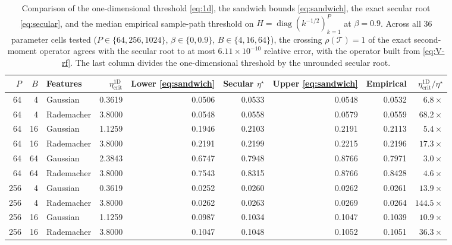 \documentclass[11pt]{article}
\theoremstyle{remark}
\begin{document}
\begin{table}[!ht]
\centering
\caption{Comparison of the one-dimensional threshold \eqref{eq:1d}, the sandwich bounds \eqref{eq:sandwich}, the exact secular root \eqref{eq:secular}, and the median empirical sample-path threshold on $H = \operatorname{diag}(k^{-1/2})_{k=1}^P$ at $\beta = 0.9$. Across all 36 parameter cells tested ($P \in \{64, 256, 1024\}$, $\beta \in \{0, 0.9\}$, $B \in \{4, 16, 64\}$), the crossing $\rho(\mathcal T) = 1$ of the exact second-moment operator agrees with the secular root to at most $6.11 \times 10^{-10}$ relative error, with the operator built from \eqref{eq:V-rf}. The last column divides the one-dimensional threshold by the unrounded secular root.}
\label{tab:rademacher}
\smallskip
{\small
\begin{tabular}{rrlrrrrrr}
\toprule
$P$ & $B$ & Features & $\eta_{\mathrm{crit}}^{\mathrm{1D}}$ & Lower \eqref{eq:sandwich} & Secular $\eta^\star$ & Upper \eqref{eq:sandwich} & Empirical & $\eta_{\mathrm{crit}}^{\mathrm{1D}} / \eta^\star$ \\
\midrule
64  & 4  & Gaussian   & 0.3619 & 0.0506 & 0.0533 & 0.0548 & 0.0532 & $6.8\times$ \\
64  & 4  & Rademacher & 3.8000 & 0.0548 & 0.0558 & 0.0579 & 0.0559 & $68.2\times$ \\
64  & 16 & Gaussian   & 1.1259 & 0.1946 & 0.2103 & 0.2191 & 0.2113 & $5.4\times$ \\
64  & 16 & Rademacher & 3.8000 & 0.2191 & 0.2199 & 0.2215 & 0.2196 & $17.3\times$ \\
64  & 64 & Gaussian   & 2.3843 & 0.6747 & 0.7948 & 0.8766 & 0.7971 & $3.0\times$ \\
64  & 64 & Rademacher & 3.8000 & 0.7543 & 0.8315 & 0.8766 & 0.8428 & $4.6\times$ \\
256 & 4  & Gaussian   & 0.3619 & 0.0252 & 0.0260 & 0.0262 & 0.0261 & $13.9\times$ \\
256 & 4  & Rademacher & 3.8000 & 0.0262 & 0.0263 & 0.0269 & 0.0264 & $144.5\times$ \\
256 & 16 & Gaussian   & 1.1259 & 0.0987 & 0.1034 & 0.1047 & 0.1039 & $10.9\times$ \\
256 & 16 & Rademacher & 3.8000 & 0.1047 & 0.1048 & 0.1052 & 0.1051 & $36.3\times$ \\
\bottomrule
\end{tabular}}
\end{table}
\end{document}

